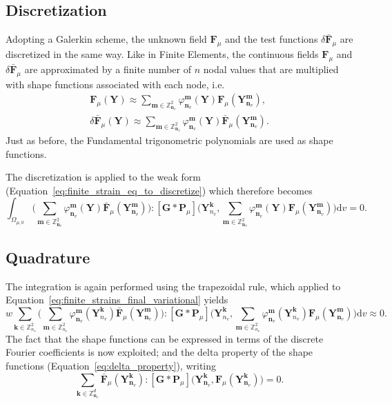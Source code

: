 \subsection{Discretization}

Adopting a Galerkin scheme, the unknown field \(\bm{F}_\mu\) and the test functions \(\delta \bar{\bm{F}}_\mu\) are discretized in the same way.
Like in Finite Elements, the continuous fields \(\bm{F}_\mu\) and \(\delta \bar{\bm{F}}_\mu\) are approximated by a finite number of \(n\) nodal values that are multiplied with shape functions associated with each node, i.e.
\begin{gather}
\bm{F}_\mu(\bm Y)  \approx \sum_{\bm m\in\mathbb{Z}^2_{\bm n_v} } \varphi_{\bm n_v}^{\bm m}(\bm Y) \bm{F}_\mu (\bm Y^{\bm m}_{\bm n_v}), \\
\delta \bar{\bm{F}}_\mu(\bm Y) \approx \sum_{\bm m\in\mathbb{Z}^2_{\bm n_v} } \varphi_{\bm n_v}^{\bm m}(\bm Y) \bar{\bm{F}}_\mu (\bm Y^{\bm m}_{\bm n_v}).
\end{gather}
Just as before, the Fundamental trigonometric polynomials are used as shape functions.

The discretization is applied to the weak form (Equation~\eqref{eq:finite_strain_eq_to_discretize}) which therefore becomes
\begin{equation} \label{eq:finite_strains_final_variational}
\int_{\Omega_{\mu,0}} \Big(\sum_{\bm m\in\mathbb{Z}^2_{\bm n_v} } \varphi_{\bm n_v}^{\bm m}(\bm Y) \bar{\bm{F}}_\mu (\bm Y^{\bm m}_{\bm n_v})\Big):[\bm{G} * \bm{P}_\mu]\Big(\bm Y^{\bm k}_{n_v}, \sum_{\bm m\in\mathbb{Z}^2_{\bm n_v} } \varphi_{\bm n_v}^{\bm m}(\bm Y) \bm{F}_\mu (\bm Y^{\bm m}_{\bm n_v})\Big) \mathrm{d} v=0.
\end{equation}

\subsection{Quadrature}

The integration is again performed using the trapezoidal rule, which applied to Equation~\eqref{eq:finite_strains_final_variational} yields
\begin{equation}
w\sum_{\bm k\in\mathbb{Z}^2_{n_v}} \Big(\sum_{\bm m\in\mathbb{Z}^2_{n_v} } \varphi_{\bm n_v}^{\bm m}(\bm Y^{\bm k}_{n_v}) \bar{\bm{F}}_\mu (\bm Y^{\bm m}_{\bm n_v})\Big):[\bm{G} * \bm{P}_\mu]\Big(\bm Y^{\bm k}_{n_v},\sum_{\bm m\in\mathbb{Z}^2_{n_v} } \varphi_{\bm n_v}^{\bm m}(\bm Y^{\bm k}_{n_v}) \bm{F}_\mu (\bm Y^{\bm m}_{\bm n_v})\Big) \mathrm{d} v\approx 0.
\end{equation}
The fact that the shape functions can be expressed in terms of the discrete Fourier coefficients is now exploited; and the delta property of the shape functions (Equation~\eqref{eq:delta_property}), writing
\begin{equation} \label{eq:final_form_sum_finite_strain}
\sum_{\bm  k \in \mathbb{Z}_{\bm n_v}^{d}} \bar{\bm{F}}_\mu (\bm Y^{\bm k}_{\bm n_v}):[\bm G * \bm P_\mu]\Big(\bm Y_{\bm n_v}^{\bm k}, \bm{F}_\mu (\bm Y^{\bm k}_{\bm n_v})\Big)=0.
\end{equation}

